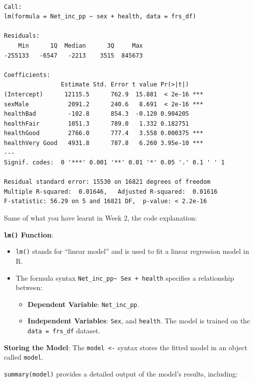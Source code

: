 \documentclass[
  letterpaper,
  DIV=11,
  numbers=noendperiod]{scrreprt}
\providecommand{\tightlist}{%
  \setlength{\itemsep}{0pt}\setlength{\parskip}{0pt}}\usepackage{longtable,booktabs,array}
\begin{document}
\begin{verbatim}

Call:
lm(formula = Net_inc_pp ~ sex + health, data = frs_df)

Residuals:
    Min      1Q  Median      3Q     Max 
-255133   -6547   -2213    3515  845673 

Coefficients:
                Estimate Std. Error t value Pr(>|t|)    
(Intercept)      12115.5      762.9  15.881  < 2e-16 ***
sexMale           2091.2      240.6   8.691  < 2e-16 ***
healthBad         -102.8      854.3  -0.120 0.904205    
healthFair        1051.3      789.0   1.332 0.182751    
healthGood        2766.0      777.4   3.558 0.000375 ***
healthVery Good   4931.8      787.8   6.260 3.95e-10 ***
---
Signif. codes:  0 '***' 0.001 '**' 0.01 '*' 0.05 '.' 0.1 ' ' 1

Residual standard error: 15530 on 16821 degrees of freedom
Multiple R-squared:  0.01646,   Adjusted R-squared:  0.01616 
F-statistic: 56.29 on 5 and 16821 DF,  p-value: < 2.2e-16
\end{verbatim}

Same of what you have learnt in Week 2, the code explanation:

\textbf{\texttt{lm()} Function}:

\begin{itemize}
\tightlist
\item
  \texttt{lm()} stands for ``linear model'' and is used to fit a linear
  regression model in R.
\item
  The formula syntax
  \texttt{Net\_inc\_pp\textasciigrave{}\textasciigrave{}\textasciitilde{}\ Sex\ +\ health}
  specifies a relationship between:

  \begin{itemize}
  \tightlist
  \item
    \textbf{Dependent Variable}: \texttt{Net\_inc\_pp}.
  \item
    \textbf{Independent Variables}: \texttt{Sex}, and \texttt{health}.
    The model is trained on the \texttt{data\ =\ frs\_df} dataset.
  \end{itemize}
\end{itemize}

\textbf{Storing the Model}: The \texttt{model\ \textless{}-} syntax
stores the fitted model in an object called \texttt{model}.

\texttt{summary(model)} provides a detailed output of the model's
results, including:
\end{document}
